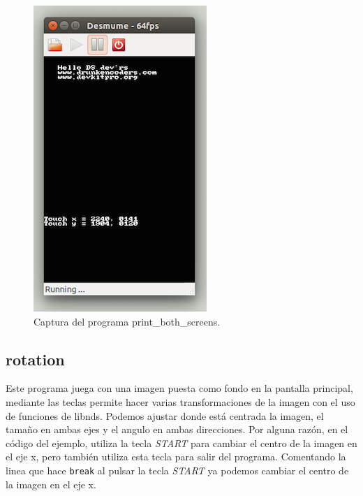 \documentclass[12pt,english]{article}
\begin{document}
    \begin{figure}[H] 
    \centering
    \includegraphics[scale=0.5]{p3Media/print_both_screens}
    \caption{Captura del programa print\_both\_screens.}
    \end{figure}

    \newpage

    \subsection{rotation}

    Este programa juega con una imagen puesta como fondo en la pantalla principal, mediante las teclas permite hacer varias transformaciones de la imagen con el uso de funciones de libnds. Podemos ajustar donde está centrada la imagen, el tamaño en ambas ejes y el angulo en ambas direcciones. Por alguna razón, en el código del ejemplo, utiliza la tecla \emph{START} para cambiar el centro de la imagen en el eje x, pero también utiliza esta tecla para salir del programa. Comentando la linea que hace \texttt{break} al pulsar la tecla \emph{START} ya podemos cambiar el centro de la imagen en el eje x.
\end{document}
